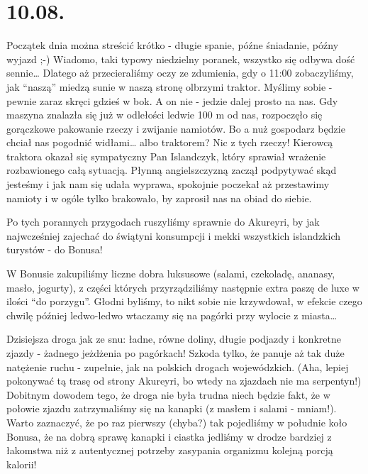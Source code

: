 \chapter*{10.08.}

Początek dnia można streścić krótko - długie spanie, późne śniadanie, późny wyjazd ;-) Wiadomo, taki typowy niedzielny poranek, wszystko się odbywa dość sennie… Dlatego aż przecieraliśmy oczy ze zdumienia, gdy o 11:00 zobaczyliśmy, jak “naszą” miedzą sunie w naszą stronę olbrzymi traktor. Myślimy sobie - pewnie zaraz skręci gdzieś w bok. A on nie - jedzie dalej prosto na nas. Gdy maszyna znalazła się już w odlełości ledwie 100 m od nas, rozpoczęło się gorączkowe pakowanie rzeczy i zwijanie namiotów. Bo a nuż gospodarz będzie chciał nas pogodnić widłami… albo traktorem? Nic z tych rzeczy! Kierowcą traktora okazał się sympatyczny Pan Islandczyk, który sprawiał wrażenie rozbawionego całą sytuacją. Płynną angielszczyzną zaczął podpytywać skąd jesteśmy i jak nam się udała wyprawa, spokojnie poczekał aż przestawimy namioty i w ogóle tylko brakowało, by zaprosił nas na obiad do siebie.

Po tych porannych przygodach ruszyliśmy sprawnie do Akureyri, by jak najwcześniej zajechać do świątyni konsumpcji i mekki wszystkich islandzkich turystów - do Bonusa!


W Bonusie zakupiliśmy liczne dobra luksusowe (salami, czekoladę, ananasy, masło, jogurty), z części których przyrządziliśmy następnie extra paszę de luxe w ilości “do porzygu”. Głodni byliśmy, to nikt sobie nie krzywdował, w efekcie czego chwilę później ledwo-ledwo wtaczamy się na pagórki przy wylocie z miasta…


Dzisiejsza droga jak ze snu: ładne, równe doliny, długie podjazdy i konkretne zjazdy - żadnego jeżdżenia po pagórkach! Szkoda tylko, że panuje aż tak duże natężenie ruchu - zupełnie, jak na polskich drogach wojewódzkich. (Aha, lepiej pokonywać tą trasę od strony Akureyri, bo wtedy na zjazdach nie ma serpentyn!) Dobitnym dowodem tego, że droga nie była trudna niech będzie fakt, że w połowie zjazdu zatrzymaliśmy się na kanapki (z masłem i salami - mniam!). Warto zaznaczyć, że po raz pierwszy (chyba?) tak pojedliśmy w południe koło Bonusa, że na dobrą sprawę kanapki i ciastka jedliśmy w drodze bardziej z łakomstwa niż z autentycznej potrzeby zasypania organizmu kolejną porcją kalorii!


